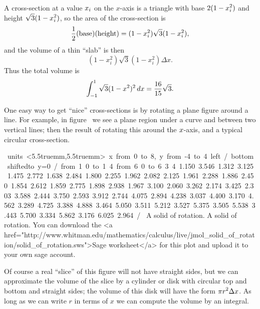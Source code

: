 A cross-section at a value $\displaystyle x_i$ on the $x$-axis is a triangle with
base $\displaystyle 2(1-x_i^2)$ and height $\displaystyle \sqrt3(1-x_i^2)$, so the area of the
cross-section is 
$$
  {1\over2}(\hbox{base})(\hbox{height})=
  (1-x_i^2)\sqrt3(1-x_i^2),
$$
and the volume of a thin ``slab'' is then
$$(1-x_i^2)\sqrt3(1-x_i^2)\Delta x.$$
Thus the total volume is 
$$\int_{-1}^1 \sqrt3(1-x^2)^2\,dx={16\over15}\sqrt3.$$
\vskip-10pt\endexample

One easy way to get ``nice'' cross-sections is by rotating a plane
figure around a line. For example, in figure~ we see a plane region under a curve and between two
vertical lines; then the result of rotating this around the $\displaystyle
x$-axis, and
a typical circular cross-section.

\figure
\texonly
\vbox{\hbox{\hfill{}\vbox{
\beginpicture
\normalgraphs
\ninepoint
\setcoordinatesystem units <5.5truemm,5.5truemm>
\setplotarea x from 0 to 8, y from -4 to 4
\axis left /
\axis bottom shiftedto y=0 / 
\putrule from 1 0 to 1 4 
\putrule from 6 0 to 6 3
 4 1.150 3.546 
1.312 3.125 1.475 2.772 1.638 2.484 1.800 2.255 1.962 2.082 
2.125 1.961 2.288 1.886 2.450 1.854 2.612 1.859 2.775 1.898 
2.938 1.967 3.100 2.060 3.262 2.174 3.425 2.303 3.588 2.444 
3.750 2.593 3.912 2.744 4.075 2.894 4.238 3.037 4.400 3.170 
4.562 3.289 4.725 3.388 4.888 3.464 5.050 3.511 5.212 3.527 
5.375 3.505 5.538 3.443 5.700 3.334 5.862 3.176 6.025 2.964 /
\endpicture
}
\quad{}
\quad{}
\hfill}\vglue-0pt}
\begincaption
A solid of rotation.
\endcaption
\endtexonly
{}
\htmlonly
\begincaption
A solid of rotation. You can download the <a href="http://www.whitman.edu/mathematics/calculus/live/jmol_solid_of_rotation/solid_of_rotation.sws">Sage
worksheet</a>
for this plot and upload it to your own sage account.
\endcaption
\endhtmlonly
\endfigure

Of course a real ``slice'' of this figure will not have straight
sides, but we can approximate the volume of the slice by a cylinder or
disk with circular top and bottom and straight sides; the volume of
this disk will have the form $\displaystyle \pi r^2\Delta x$. As long as we can
write $r$ in terms of $x$ we can compute the volume by an integral.


